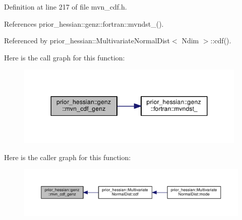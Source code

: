 Definition at line 217 of file mvn\+\_\+cdf.\+h.



References prior\+\_\+hessian\+::genz\+::fortran\+::mvndst\+\_\+().



Referenced by prior\+\_\+hessian\+::\+Multivariate\+Normal\+Dist$<$ Ndim $>$\+::cdf().



Here is the call graph for this function\+:\nopagebreak
\begin{figure}[H]
\begin{center}
\leavevmode
\includegraphics[width=312pt]{namespaceprior__hessian_1_1genz_a5462d1271384fa7431ee84709c0f8a88_cgraph}
\end{center}
\end{figure}




Here is the caller graph for this function\+:\nopagebreak
\begin{figure}[H]
\begin{center}
\leavevmode
\includegraphics[width=350pt]{namespaceprior__hessian_1_1genz_a5462d1271384fa7431ee84709c0f8a88_icgraph}
\end{center}
\end{figure}


